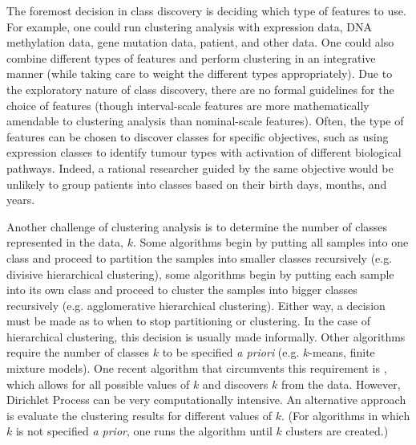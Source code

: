 The foremost decision in class discovery is deciding which type of features to use. For example, one could run clustering analysis with expression data, DNA methylation data, gene mutation data, patient, and other data. One could also combine different types of features and perform clustering in an integrative manner (while taking care to weight the different types appropriately). Due to the exploratory nature of class discovery, there are no formal guidelines for the choice of features (though interval-scale features are more mathematically amendable to clustering analysis than nominal-scale features). Often, the type of features can be chosen to discover classes for specific objectives, such as using expression classes to identify tumour types with activation of different biological pathways. Indeed, a rational researcher guided by the same objective would be unlikely to group patients into classes based on their birth days, months, and years.

Another challenge of clustering analysis is to determine the number of classes represented in the data, $k$. Some algorithms begin by putting all samples into one class and proceed to partition the samples into smaller classes recursively (e.g. divisive hierarchical clustering), some algorithms begin by putting each sample into its own class and proceed to cluster the samples into bigger classes recursively (e.g. agglomerative hierarchical clustering). Either way, a decision must be made as to when to stop partitioning or clustering. In the case of hierarchical clustering, this decision is usually made informally. Other algorithms require the number of classes $k$ to be specified \emph{a priori} (e.g. $k$-means, finite mixture models). One recent algorithm that circumvents this requirement is , which allows for all possible values of $k$ and discovers $k$ from the data. However, Dirichlet Process can be very computationally intensive. An alternative approach is evaluate the clustering results for different values of $k$. (For algorithms in which $k$ is not specified \emph{a prior}, one runs the algorithm until $k$ clusters are created.)

